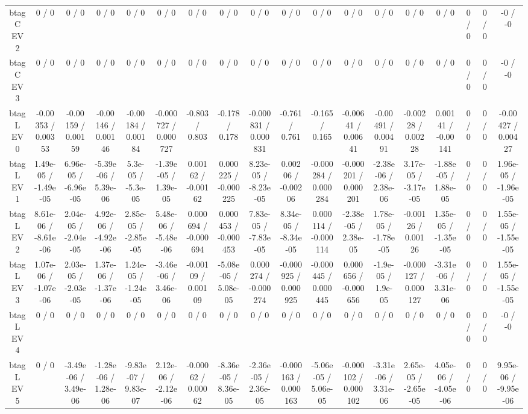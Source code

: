 \documentclass[10pt]{article}
\begin{document}
\begin{table}[htbp]
\begin{center}
\begin{tabular}{|c|c|c|c|c|c|c|c|c|c|c|c|c|c|c|c|c|c|}
  btag C EV 2 & 0 / 0 & 0 / 0 & 0 / 0 & 0 / 0 & 0 / 0 & 0 / 0 & 0 / 0 & 0 / 0 & 0 / 0 & 0 / 0 & 0 / 0 & 0 / 0 & 0 / 0 & 0 / 0 & 0 / 0 & 0 / 0 & -0 / -0 \\ 
  btag C EV 3 & 0 / 0 & 0 / 0 & 0 / 0 & 0 / 0 & 0 / 0 & 0 / 0 & 0 / 0 & 0 / 0 & 0 / 0 & 0 / 0 & 0 / 0 & 0 / 0 & 0 / 0 & 0 / 0 & 0 / 0 & 0 / 0 & -0 / -0 \\ 
  btag L EV 0 & -0.00353 / 0.00353 & -0.00159 / 0.00159 & -0.00146 / 0.00146 & -0.00184 / 0.00184 & -0.000727 / 0.000727 & -0.803 / 0.803 & -0.178 / 0.178 & -0.000831 / 0.000831 & -0.761 / 0.761 & -0.165 / 0.165 & -0.00641 / 0.00641 & -0.00491 / 0.00491 & -0.00228 / 0.00228 & 0.00141 / -0.00141 & 0 / 0 & 0 / 0 & -0.00427 / 0.00427 \\ 
  btag L EV 1 & 1.49e-05 / -1.49e-05 & 6.96e-05 / -6.96e-05 & -5.39e-06 / 5.39e-06 & 5.3e-05 / -5.3e-05 & -1.39e-05 / 1.39e-05 & 0.00162 / -0.00162 & 0.000225 / -0.000225 & 8.23e-05 / -8.23e-05 & 0.00206 / -0.00206 & -0.000284 / 0.000284 & -0.000201 / 0.000201 & -2.38e-06 / 2.38e-06 & 3.17e-05 / -3.17e-05 & -1.88e-05 / 1.88e-05 & 0 / 0 & 0 / 0 & 1.96e-05 / -1.96e-05 \\ 
  btag L EV 2 & 8.61e-06 / -8.61e-06 & 2.04e-05 / -2.04e-05 & 4.92e-06 / -4.92e-06 & 2.85e-05 / -2.85e-05 & 5.48e-06 / -5.48e-06 & 0.000694 / -0.000694 & 0.000453 / -0.000453 & 7.83e-05 / -7.83e-05 & 8.34e-05 / -8.34e-05 & 0.000114 / -0.000114 & -2.38e-05 / 2.38e-05 & 1.78e-05 / -1.78e-05 & -0.00126 / 0.00126 & 1.35e-05 / -1.35e-05 & 0 / 0 & 0 / 0 & 1.55e-05 / -1.55e-05 \\ 
  btag L EV 3 & 1.07e-06 / -1.07e-06 & 2.03e-05 / -2.03e-05 & 1.37e-06 / -1.37e-06 & 1.24e-05 / -1.24e-05 & -3.46e-06 / 3.46e-06 & -0.00109 / 0.00109 & -5.08e-05 / 5.08e-05 & 0.000274 / -0.000274 & -0.000925 / 0.000925 & -0.000445 / 0.000445 & 0.000656 / -0.000656 & -1.9e-05 / 1.9e-05 & -0.000127 / 0.000127 & -3.31e-06 / 3.31e-06 & 0 / 0 & 0 / 0 & 1.55e-05 / -1.55e-05 \\ 
  btag L EV 4 & 0 / 0 & 0 / 0 & 0 / 0 & 0 / 0 & 0 / 0 & 0 / 0 & 0 / 0 & 0 / 0 & 0 / 0 & 0 / 0 & 0 / 0 & 0 / 0 & 0 / 0 & 0 / 0 & 0 / 0 & 0 / 0 & -0 / -0 \\ 
  btag L EV 5 & 0 / 0 & -3.49e-06 / 3.49e-06 & -1.28e-06 / 1.28e-06 & -9.83e-07 / 9.83e-07 & 2.12e-06 / -2.12e-06 & -0.00062 / 0.00062 & -8.36e-05 / 8.36e-05 & -2.36e-05 / 2.36e-05 & -0.000163 / 0.000163 & -5.06e-05 / 5.06e-05 & -0.000102 / 0.000102 & -3.31e-06 / 3.31e-06 & 2.65e-05 / -2.65e-05 & 4.05e-06 / -4.05e-06 & 0 / 0 & 0 / 0 & 9.95e-06 / -9.95e-06 \\ 

\end{tabular}
\end{center}
\end{table}
\end{document}
